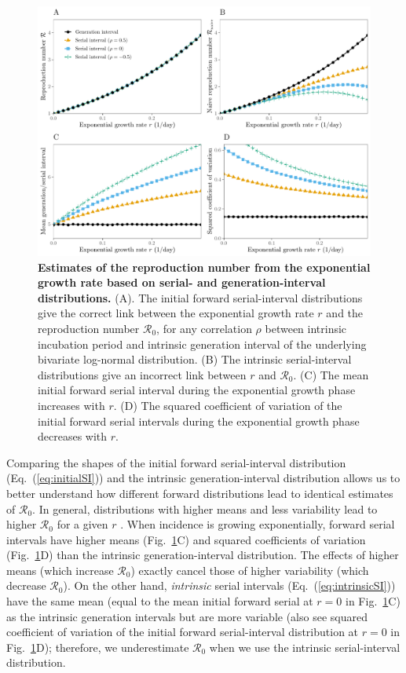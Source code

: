 \documentclass[12pt]{article}
\newcommand{\eref}[1]{Eq.~(\ref{eq:#1})}
\newcommand{\fref}[1]{Fig.~\ref{fig:#1}}
\newcommand{\Rx}[1]{\ensuremath{{\mathcal R}_{#1}}\xspace}
\newcommand{\Ro}{\Rx{0}}
\begin{document}
\begin{figure}[!th]
\includegraphics[width=\textwidth]{rR.pdf}
\caption{
\textbf{Estimates of the reproduction number from the exponential growth rate based on serial- and generation-interval distributions.}
(A). The initial forward serial-interval distributions give the correct
link between the exponential growth rate $r$ and the reproduction
number \Ro,
for any correlation $\rho$ between intrinsic incubation period and
intrinsic generation interval of the underlying bivariate log-normal distribution.
(B) The intrinsic serial-interval distributions give an incorrect link between $r$ and \Ro.
(C) The mean initial forward serial interval during the exponential growth phase increases with $r$.
(D) The squared coefficient of variation of the initial forward serial intervals during the exponential growth phase decreases with $r$.
}
\label{fig:rR}
\end{figure}

Comparing the shapes of the initial forward serial-interval distribution (\eref{initialSI}) and the intrinsic generation-interval distribution allows us to better understand how different forward distributions lead to identical estimates of \Ro.
In general, distributions with higher means and less variability lead to higher \Ro for a given $r$ \citep{wallinga2007generation, weitz2015modeling, park2019practical}.
When incidence is growing exponentially, forward serial intervals have higher means (\fref{rR}C) and squared coefficients of variation (\fref{rR}D) than the intrinsic generation-interval distribution.
The effects of higher means (which increase \Ro) exactly cancel those of higher variability (which decrease \Ro).
On the other hand, \emph{intrinsic} serial intervals (\eref{intrinsicSI}) have the same mean (equal to the mean initial forward serial at $r=0$ in \fref{rR}C) as the intrinsic generation intervals but are more variable (also see squared coefficient of variation of the initial forward serial-interval distribution at $r=0$ in \fref{rR}D); 
therefore, we underestimate \Ro when we use the intrinsic serial-interval distribution.
\end{document}
